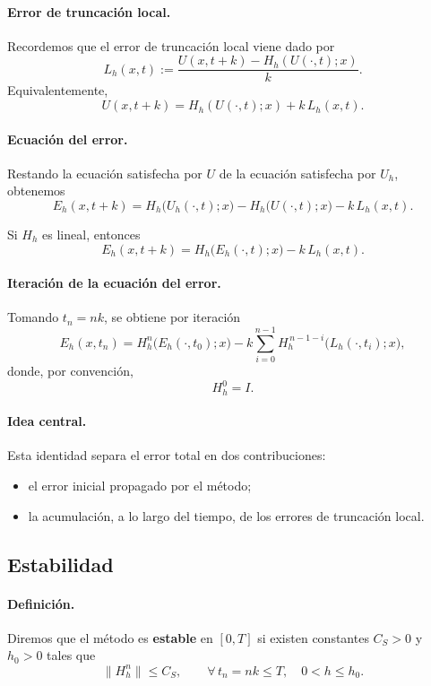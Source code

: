 \paragraph{Error de truncación local.}
Recordemos que el error de truncación local viene dado por
\[
L_h(x,t):=\frac{U(x,t+k)-H_h(U(\cdot,t);x)}{k}.
\]
Equivalentemente,
\[
U(x,t+k)=H_h(U(\cdot,t);x)+k\,L_h(x,t).
\]

\paragraph{Ecuación del error.}
Restando la ecuación satisfecha por \(U\) de la ecuación satisfecha por \(U_h\), obtenemos
\[
E_h(x,t+k)
=
H_h\bigl(U_h(\cdot,t);x\bigr)-H_h\bigl(U(\cdot,t);x\bigr)-k\,L_h(x,t).
\]

Si \(H_h\) es lineal, entonces
\[
E_h(x,t+k)=H_h\bigl(E_h(\cdot,t);x\bigr)-k\,L_h(x,t).
\]

\paragraph{Iteración de la ecuación del error.}
Tomando \(t_n=nk\), se obtiene por iteración
\[
E_h(x,t_n)
=
H_h^n\bigl(E_h(\cdot,t_0);x\bigr)
-
k\sum_{i=0}^{n-1}
H_h^{\,n-1-i}\bigl(L_h(\cdot,t_i);x\bigr),
\]
donde, por convención,
\[
H_h^0=I.
\]

\paragraph{Idea central.}
Esta identidad separa el error total en dos contribuciones:
\begin{itemize}
    \item el error inicial propagado por el método;
    \item la acumulación, a lo largo del tiempo, de los errores de truncación local.
\end{itemize}

\subsection{Estabilidad}

\paragraph{Definición.}
Diremos que el método es \textbf{estable} en \([0,T]\) si existen constantes \(C_S>0\) y \(h_0>0\) tales que
\[
\|H_h^n\|\le C_S,
\qquad
\forall\, t_n=nk\le T,\quad 0<h\le h_0.
\]

